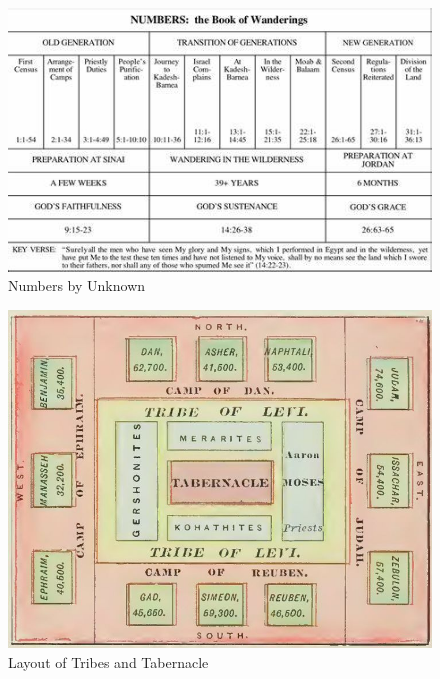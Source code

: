 \newpage
\begin{figure}
\begin{center}
\includegraphics[scale=1.2, angle=90]{04OT-Numbers/References/Numbers.jpg}
\caption[Numbers by Unknown]{Numbers by Unknown}
\label{fig:Numbers by Unknown}
\end{center}
\end{figure}

\newpage
\begin{figure}
\begin{center}
\includegraphics[scale=.8, angle=0]{04OT-Numbers/References/LayoutOfTribesAndTabernacle.jpg}
\caption[Layout of Tribes and Tabernacle]{Layout of Tribes and Tabernacle}
\label{fig:Layout of Tribes and Tabernacle}
\end{center}
\end{figure}
